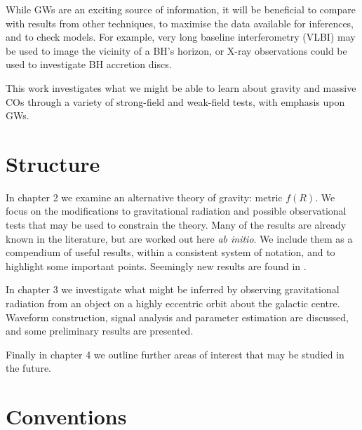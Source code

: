 While GWs are an exciting source of information, it will be beneficial to compare with results from other techniques, to maximise the data available for inferences, and to check models. For example, very long baseline interferometry (VLBI) may be used to image the vicinity of a BH's horizon, or X-ray observations could be used to investigate BH accretion discs\cite{Psaltis2008}.

This work investigates what we might be able to learn about gravity and massive COs through a variety of strong-field and weak-field tests, with emphasis upon GWs.

\section{Structure}

In chapter 2 we examine an alternative theory of gravity: metric $f(R)$. We focus on the modifications to gravitational radiation and possible observational tests that may be used to constrain the theory. Many of the results are already known in the literature, but are worked out here {\it ab initio}. We include them as a compendium of useful results, within a consistent system of notation, and to highlight some important points. Seemingly new results are found in .

In chapter 3 we investigate what might be inferred by observing gravitational radiation from an object on a highly eccentric orbit about the galactic centre. Waveform construction, signal analysis and parameter estimation are discussed, and some preliminary results are presented.

Finally in chapter 4 we outline further areas of interest that may be studied in the future.

\section{Conventions}

